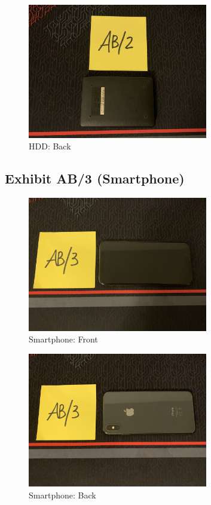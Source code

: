 \begin{figure}[h]
  \centering
  \includegraphics[width=0.7\textwidth]{figures/pictures/IMG_5045.JPG}
  \caption{HDD: Back}
  \label{fig:hdd-back}
\end{figure}
\newpage

\subsection{Exhibit AB/3 (Smartphone)}
\label{s:ab3}

\begin{figure}[h]
  \centering
  \includegraphics[width=0.7\textwidth]{figures/pictures/IMG_5046.JPG}
  \caption{Smartphone: Front}
  \label{fig:smartphone-front}
\end{figure}

\begin{figure}[h]
  \centering
  \includegraphics[width=0.7\textwidth]{figures/pictures/IMG_5047.JPG}
  \caption{Smartphone: Back}
  \label{fig:smartphone-back}
\end{figure}
\newpage

